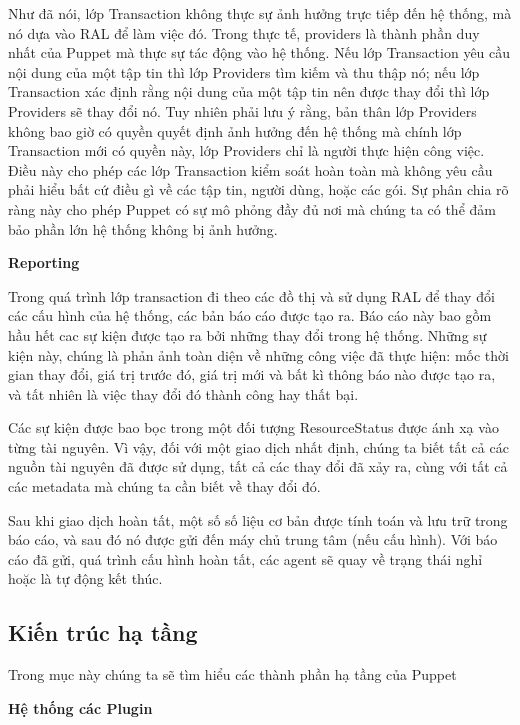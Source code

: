 Như đã nói, lớp Transaction không thực sự ảnh hưởng  trực tiếp đến hệ thống, mà nó dựa vào RAL để làm việc đó. Trong thực tế, providers là thành phần duy nhất của Puppet mà thực sự tác động vào hệ thống. Nếu lớp Transaction yêu cầu nội dung của một tập tin thì lớp Providers tìm kiếm và thu thập nó; nếu lớp Transaction xác định rằng nội dung của một tập tin nên được thay đổi thì lớp Providers sẽ thay đổi nó. Tuy nhiên phải lưu ý rằng, bản thân lớp Providers không bao giờ có quyền quyết định ảnh hưởng đến hệ thống mà chính lớp Transaction mới có quyền này, lớp Providers chỉ là người thực hiện công việc. Điều này cho phép các lớp Transaction kiểm soát hoàn toàn mà không yêu cầu phải hiểu bất cứ điều gì về các tập tin, người dùng, hoặc các gói. Sự phân chia rõ ràng này cho phép Puppet có sự mô phỏng đầy đủ nơi mà chúng ta có thể đảm bảo phần lớn hệ thống không bị ảnh hưởng.


\textbf{\large Reporting}


Trong quá trình lớp transaction đi theo các đồ thị và sử dụng RAL để thay đổi các cấu hình của hệ thống, các bản báo cáo được tạo ra. Báo cáo này bao gồm hầu hết cac sự kiện được tạo ra bởi những thay đổi trong hệ thống. Những sự kiện này, chúng là phản ảnh toàn diện về những công việc đã thực hiện: mốc thời gian thay đổi, giá trị trước đó, giá trị mới và bất kì thông báo nào được tạo ra, và tất nhiên là việc thay đổi đó thành công hay thất bại.

Các sự kiện được bao bọc trong một đối tượng ResourceStatus được ánh xạ vào từng tài nguyên. Vì vậy, đối với một giao dịch nhất định, chúng ta biết tất cả các nguồn tài nguyên đã được sử dụng, tất cả các thay đổi đã xảy ra, cùng với tất cả các metadata mà chúng ta cần biết về thay đổi đó.

Sau khi giao dịch hoàn tất, một số số liệu cơ bản được tính toán và lưu trữ trong báo cáo, và sau đó nó được gửi đến máy chủ trung tâm (nếu cấu hình). Với báo cáo đã gửi, quá trình cấu hình hoàn tất, các agent sẽ quay về trạng thái nghỉ hoặc là tự động kết thúc.


\subsection{Kiến trúc hạ tầng}

Trong mục này chúng ta sẽ tìm hiểu các thành phần hạ tầng của Puppet

\textbf{\large Hệ thống các Plugin}

